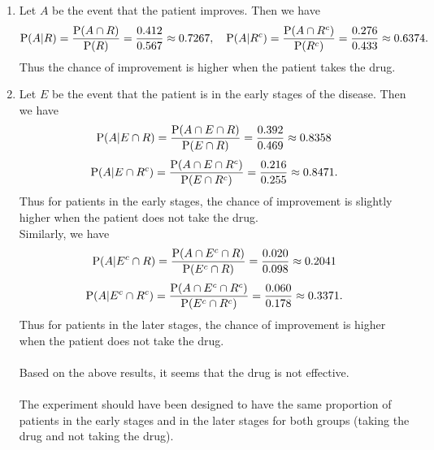 \documentclass[12pt]{article}
\newcommand{\Prob}{{\rm P}}
\newenvironment{problem}[2][Problem]{\begin{trivlist}
\item[\hskip \labelsep {\bfseries #1}\hskip \labelsep {\bfseries #2.}]}
{\end{trivlist}}
\begin{document}
\begin{problem}{3}
  \begin{enumerate}
    \item Let $A$ be the event that the patient improves.
    Then we have
    \[
      \Prob(A|R) = \frac{\Prob(A\cap R)}{\Prob(R)} = \frac{0.412}{0.567}
      \approx 0.7267, \quad
      \Prob(A|R^c) = \frac{\Prob(A\cap R^c)}{\Prob(R^c)} = \frac{0.276}{0.433}
      \approx 0.6374.
    \]
    Thus the chance of improvement is higher when the patient takes the drug.
    \item Let $E$ be the event that the patient is in the early stages of the
    disease. Then we have
    \[
      \Prob(A|E\cap R) = \frac{\Prob(A\cap E \cap R)}{\Prob(E \cap R)}
      = \frac{0.392}{0.469} \approx 0.8358
    \]
    \[
      \Prob(A|E\cap R^c) = \frac{\Prob(A\cap E \cap R^c)}{\Prob(E \cap R^c)}
      = \frac{0.216}{0.255} \approx 0.8471.
    \]
    Thus for patients in the early stages, the chance of improvement is
    slightly higher when the patient does not take the drug.\\
    Similarly, we have
    \[
      \Prob(A|E^c\cap R) = \frac{\Prob(A\cap E^c \cap R)}{\Prob(E^c \cap R)}
      = \frac{0.020}{0.098} \approx 0.2041
    \]
    \[
      \Prob(A|E^c\cap R^c) = \frac{\Prob(A\cap E^c \cap R^c)}{\Prob(E^c \cap R^c)}
      = \frac{0.060}{0.178} \approx 0.3371.
    \]
    Thus for patients in the later stages, the chance of improvement is
    higher when the patient does not take the drug.\\\\
    Based on the above results, it seems that the drug is not effective.\\\\
    The experiment should have been designed to have the same proportion
    of patients in the early stages and in the later stages for both
    groups (taking the drug and not taking the drug).
  \end{enumerate}
\end{problem}
\end{document}
